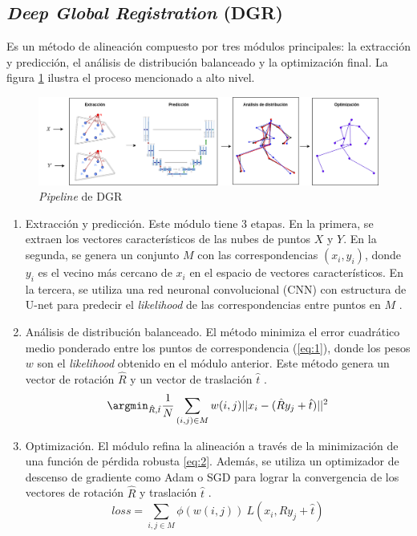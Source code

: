 \subsection{\textit{Deep Global Registration} (DGR)}
Es un método de alineación compuesto por tres módulos principales: la extracción y predicción, el análisis de distribución balanceado y la optimización final. La figura \ref{fig:dgr} ilustra el proceso mencionado a alto nivel.

\begin{figure}[!h]
    \centering
    \includegraphics[scale=0.325]{images/dgr.png}
    \caption{\textit{Pipeline} de DGR}
    \label{fig:dgr}
\end{figure}

\begin{enumerate}
    \item Extracción y predicción. Este módulo tiene 3 etapas. En la primera, se extraen los vectores característicos de las nubes de puntos $X$ y $Y$. En la segunda, se genera un conjunto $M$ con las correspondencias $(x_i, y_i)$, donde $y_i$ es el vecino más cercano de $x_i$ en el espacio de vectores característicos. En la tercera, se utiliza una red neuronal convolucional (CNN) con estructura de U-net para predecir el \textit{likelihood} de las correspondencias entre puntos en $M$ \cite{10}.
    
    \item Análisis de distribución balanceado. El método minimiza el error cuadrático medio ponderado entre los puntos de correspondencia (\ref{eq:1}), donde los pesos $w$ son el \textit{likelihood} obtenido en el módulo anterior. Este método genera un vector de rotación $\hat{R}$ y un vector de traslación $\hat{t}$ \cite{10}.
    \begin{equation} \label{eq:1}
        \argmin_{\hat{R}, \hat{t}}\frac{1}{N}\sum_{(i, j) \in M} w(i,j) ||x_{i} - (\hat{R}y_{j} + \hat{t})||^{2}
    \end{equation}
    
    \item Optimización. El módulo refina la alineación a través de la minimización de una función de pérdida robusta \ref{eq:2}. Además, se utiliza un optimizador de descenso de gradiente como Adam o SGD para lograr la convergencia de los vectores de rotación $\hat{R}$ y traslación $\hat{t}$ \cite{10}.
    \begin{equation} \label{eq:2}
        loss = \sum_{i,j \in M} \phi(w(i,j)) \ L(x_i, \hat{R}y_{j} + \hat{t})
    \end{equation}
\end{enumerate}

